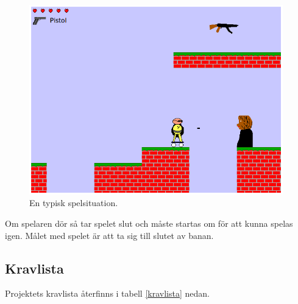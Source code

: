 \documentclass{scrartcl}
\begin{document}
\begin{figure}[h!]
\centering
\includegraphics[width=11cm]{skarmdomp}
\caption{En typisk spelsituation.}\label{screenshot}
\end{figure}

Om spelaren dör så tar spelet slut och måste startas om för att kunna spelas igen. Målet med spelet är att ta sig till slutet av banan. 



\subsection{Kravlista}
Projektets kravlista återfinns i tabell \ref{kravlista} nedan.
\end{document}
